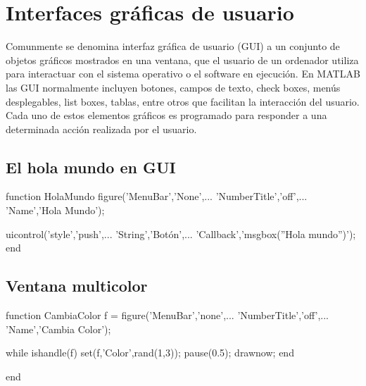 \chapter{Interfaces gráficas de usuario}

Comunmente se denomina interfaz gráfica de usuario (GUI) a un conjunto de objetos gráficos mostrados en una 
ventana, que el usuario de un ordenador utiliza para interactuar con el sistema operativo o el software en 
ejecución. En MATLAB las GUI normalmente incluyen botones, campos de texto, check boxes, menús desplegables, 
list boxes, tablas, entre otros que facilitan la interacción del usuario. Cada uno de estos elementos gráficos 
es programado para responder a una determinada acción realizada por el usuario.

\section{El hola mundo en GUI}


\sol

\begin{matlab}
function HolaMundo
figure('MenuBar','None',...
    'NumberTitle','off',...
    'Name','Hola Mundo');
 
uicontrol('style','push',...
    'String','Botón',...
    'Callback','msgbox(''Hola mundo'')');
end
\end{matlab}

\section{Ventana multicolor}


\sol

\begin{matlab}
function CambiaColor
f = figure('MenuBar','none',...
    'NumberTitle','off',...
    'Name','Cambia Color');
 
while ishandle(f)
    set(f,'Color',rand(1,3));
    pause(0.5);
    drawnow;
end
 
end
\end{matlab}

